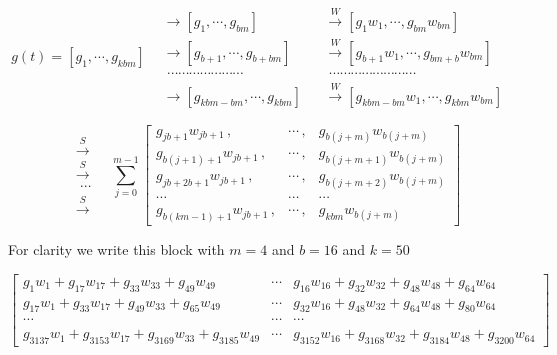 \documentclass[12pt]{article}
\begin{document}
$$
g(t) = [g_1,\cdots,g_{kbm}]
    \begin{aligned}
        &\longrightarrow [g_{1},\cdots,g_{bm}] && \stackrel{W}{\longrightarrow} [g_1w_1,\cdots,g_{b m}w_{bm}] \\
        &\longrightarrow [g_{b+1},\cdots,g_{b+bm}] && \stackrel{W}{\longrightarrow} [g_{b+1}w_1,\cdots,g_{bm+b}w_{bm}] \\
        &\,\,\cdots\cdots\cdots\cdots\cdots\cdots\cdots && \,\,\cdots\cdots\cdots\cdots\cdots\cdots\cdots\cdots \\
        &\longrightarrow [g_{kbm-bm},\cdots,g_{kbm}] && \stackrel{W}{\longrightarrow} [g_{kbm - bm}w_1,\cdots,g_{k b m}w_{bm}] 
    \end{aligned}
$$

$$
\begin{aligned}
    &\stackrel{S}{\longrightarrow}\\
    &\stackrel{S}{\longrightarrow} \\
    &\,\,\cdots \\ 
    &\stackrel{S}{\longrightarrow}
\end{aligned}
\quad\sum_{j=0}^{ m-1}
    \begin{bmatrix}
        g_{jb+1}w_{jb+1} \,, & \cdots\,, & g_{b(j + m)}w_{b(j+m)}\\
        g_{b(j+1)+1}w_{jb+1} \,,& \cdots\,, & g_{b(j+m+1)}w_{b(j+m)}\\
        g_{jb+2b+1}w_{jb+1} \,,& \cdots\,, & g_{b(j+m+2)}w_{b(j+m)}\\
        \cdots&\cdots&\cdots\\
        g_{b(km-1)+1}w_{jb+1} \,,&\cdots\,, & g_{kbm}w_{b(j+m)}
    \end{bmatrix}
$$

For clarity we write this block with $m = 4$ and $b = 16$ and $k=50$

\begin{equation}\label{eq:matrix output SW}
\begin{bmatrix}
g_1w_1+g_{17}w_{17}+g_{33}w_{33}+g_{49}w_{49} & \cdots & g_{16}w_{16}+g_{32}w_{32}+g_{48}w_{48}+g_{64}w_{64}\\
g_{17}w_1+g_{33}w_{17}+g_{49}w_{33}+g_{65}w_{49} & \cdots & g_{32}w_{16}+g_{48}w_{32}+g_{64}w_{48}+g_{80}w_{64}\\
\cdots & \cdots & \cdots \\
g_{3137}w_{1}+g_{3153}w_{17}+g_{3169}w_{33}+g_{3185}w_{49} & \cdots & g_{3152}w_{16}+g_{3168}w_{32}+g_{3184}w_{48}+g_{3200}w_{64}
\end{bmatrix}
\end{equation}
\end{document}

